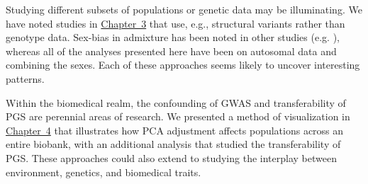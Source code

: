 Studying different subsets of populations or genetic data may be illuminating. We have noted studies in \hyperref[chap:chapter3]{Chapter~3} that use, e.g., structural variants rather than genotype data. Sex-bias in admixture has been noted in other studies (e.g. \citep{ongaro_evaluating_2021,korunes_sex-biased_2022,marcheco-teruel_cuba_2014}), whereas all of the analyses presented here have been on autosomal data and combining the sexes. Each of these approaches seems likely to uncover interesting patterns.

Within the biomedical realm, the confounding of GWAS and transferability of PGS are perennial areas of research. We presented a method of visualization in \hyperref[chap:chapter4]{Chapter~4} that illustrates how PCA adjustment affects populations across an entire biobank, with an additional analysis that studied the transferability of PGS. These approaches could also extend to studying the interplay between environment, genetics, and biomedical traits.
